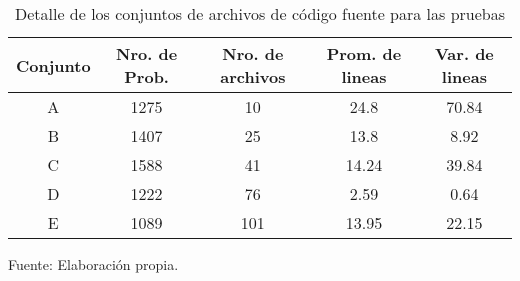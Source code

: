 \begin{table}[H]
\centering
\begin{tabular}{|c||c|c|c|c|}
\hline
Conjunto & Nro. de Prob. & Nro. de archivos & Prom. de lineas & Var. de lineas \\ \hline \hline
A & 1275  & 10 & 24.8 & 70.84\\ \hline
B & 1407  & 25 & 13.8 & 8.92 \\ \hline
C & 1588  & 41 & 14.24 & 39.84 \\ \hline
D & 1222  & 76 & 2.59 & 0.64 \\ \hline
E & 1089  & 101 & 13.95 & 22.15 \\ \hline
\end{tabular}
\caption{Detalle de los conjuntos de archivos de código fuente para las pruebas}
Fuente: Elaboración propia.
\label{conjuntoArchivos}
\end{table}
